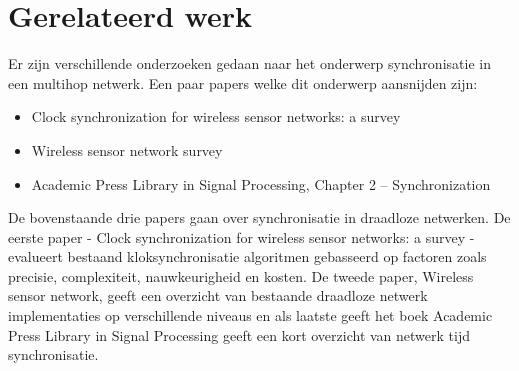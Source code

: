 \documentclass{article}
\begin{document}
\section{Gerelateerd werk}
Er zijn verschillende onderzoeken gedaan naar het onderwerp synchronisatie in een multihop netwerk. 
Een paar papers welke dit onderwerp aansnijden zijn: 
\begin{itemize}
	\item Clock synchronization for wireless sensor networks: a survey
	\item Wireless sensor network survey
	\item Academic Press Library in Signal Processing, Chapter 2 – Synchronization
\end{itemize}
De bovenstaande drie papers gaan over synchronisatie in draadloze netwerken. De eerste paper - Clock synchronization for wireless sensor networks: a survey - evalueert bestaand kloksynchronisatie algoritmen gebasseerd op factoren zoals precisie, complexiteit, nauwkeurigheid en kosten. De tweede paper, Wireless sensor network, geeft een overzicht van bestaande draadloze netwerk implementaties op verschillende niveaus en als laatste geeft het boek Academic Press Library in Signal Processing geeft een kort overzicht van netwerk tijd synchronisatie. 
\end{document}
